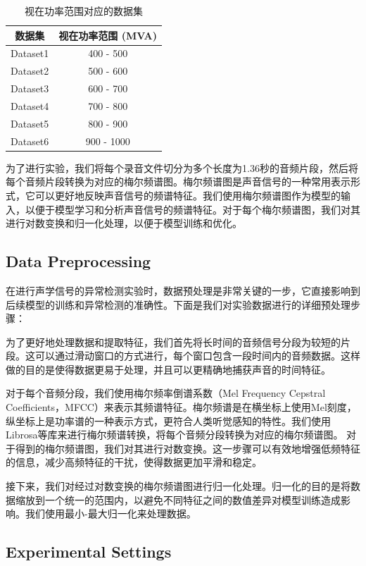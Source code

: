 \documentclass{article}
\begin{document}
\begin{table}[h!]
\centering
\begin{tabular}{c c}
\toprule
\textbf{数据集} & \textbf{视在功率范围 (MVA)} \\
\midrule
Dataset1 & 400 - 500 \\
Dataset2 & 500 - 600 \\
Dataset3 & 600 - 700 \\
Dataset4 & 700 - 800 \\
Dataset5 & 800 - 900 \\
Dataset6 & 900 - 1000 \\
\bottomrule
\end{tabular}
\caption{视在功率范围对应的数据集}
\label{table:datasets}
\end{table}


为了进行实验，我们将每个录音文件切分为多个长度为1.36秒的音频片段，然后将每个音频片段转换为对应的梅尔频谱图。梅尔频谱图是声音信号的一种常用表示形式，它可以更好地反映声音信号的频谱特征。我们使用梅尔频谱图作为模型的输入，以便于模型学习和分析声音信号的频谱特征。对于每个梅尔频谱图，我们对其进行对数变换和归一化处理，以便于模型训练和优化。

\subsection{Data Preprocessing}

在进行声学信号的异常检测实验时，数据预处理是非常关键的一步，它直接影响到后续模型的训练和异常检测的准确性。下面是我们对实验数据进行的详细预处理步骤：


为了更好地处理数据和提取特征，我们首先将长时间的音频信号分段为较短的片段。这可以通过滑动窗口的方式进行，每个窗口包含一段时间内的音频数据。这样做的目的是使得数据更易于处理，并且可以更精确地捕获声音的时间特征。


对于每个音频分段，我们使用梅尔频率倒谱系数（Mel Frequency Cepstral Coefficients，MFCC）来表示其频谱特征。梅尔频谱是在横坐标上使用Mel刻度，纵坐标上是功率谱的一种表示方式，更符合人类听觉感知的特性。我们使用Librosa等库来进行梅尔频谱转换，将每个音频分段转换为对应的梅尔频谱图。 对于得到的梅尔频谱图，我们对其进行对数变换。这一步骤可以有效地增强低频特征的信息，减少高频特征的干扰，使得数据更加平滑和稳定。

接下来，我们对经过对数变换的梅尔频谱图进行归一化处理。归一化的目的是将数据缩放到一个统一的范围内，以避免不同特征之间的数值差异对模型训练造成影响。我们使用最小-最大归一化来处理数据。

\subsection{Experimental Settings}
\end{document}
